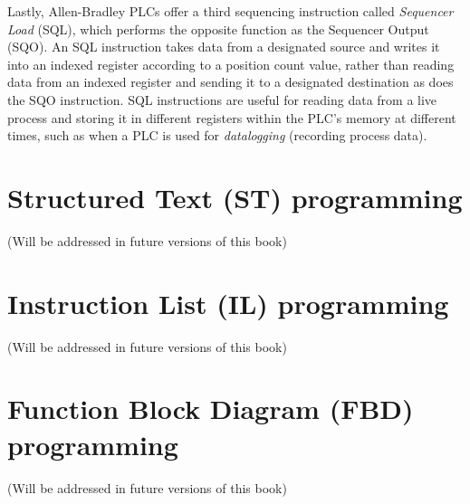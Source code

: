 \vskip 10pt

\filbreak

Lastly, Allen-Bradley PLCs offer a third sequencing instruction called \textit{Sequencer Load} (SQL), which performs the opposite function as the Sequencer Output (SQO).  An SQL instruction takes data from a designated source and writes it into an indexed register according to a position count value, rather than reading data from an indexed register and sending it to a designated destination as does the SQO instruction.  SQL instructions are useful for reading data from a live process and storing it in different registers within the PLC's memory at different times, such as when a PLC is used for \textit{datalogging} (recording process data).    









\filbreak
\section{Structured Text (ST) programming}

(Will be addressed in future versions of this book)


\vskip 10pt





\filbreak
\section{Instruction List (IL) programming}

(Will be addressed in future versions of this book)

\vskip 10pt






\filbreak
\section{Function Block Diagram (FBD) programming}

(Will be addressed in future versions of this book)

\vskip 10pt






